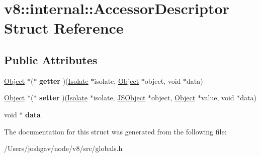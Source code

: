\hypertarget{structv8_1_1internal_1_1_accessor_descriptor}{}\section{v8\+:\+:internal\+:\+:Accessor\+Descriptor Struct Reference}
\label{structv8_1_1internal_1_1_accessor_descriptor}
\subsection*{Public Attributes}
\begin{DoxyCompactItemize}
\item 
\hyperlink{classv8_1_1internal_1_1_object}{Object} $\ast$($\ast$ {\bfseries getter} )(\hyperlink{classv8_1_1internal_1_1_isolate}{Isolate} $\ast$isolate, \hyperlink{classv8_1_1internal_1_1_object}{Object} $\ast$object, void $\ast$data)\hypertarget{structv8_1_1internal_1_1_accessor_descriptor_a0fd4975f95e4accee711fe7144fcd91c}{}\label{structv8_1_1internal_1_1_accessor_descriptor_a0fd4975f95e4accee711fe7144fcd91c}

\item 
\hyperlink{classv8_1_1internal_1_1_object}{Object} $\ast$($\ast$ {\bfseries setter} )(\hyperlink{classv8_1_1internal_1_1_isolate}{Isolate} $\ast$isolate, \hyperlink{classv8_1_1internal_1_1_j_s_object}{J\+S\+Object} $\ast$object, \hyperlink{classv8_1_1internal_1_1_object}{Object} $\ast$value, void $\ast$data)\hypertarget{structv8_1_1internal_1_1_accessor_descriptor_abe99f0b12d8048825a324b575b837dca}{}\label{structv8_1_1internal_1_1_accessor_descriptor_abe99f0b12d8048825a324b575b837dca}

\item 
void $\ast$ {\bfseries data}\hypertarget{structv8_1_1internal_1_1_accessor_descriptor_acc4fa03840c10eea3f97798ea0cfc632}{}\label{structv8_1_1internal_1_1_accessor_descriptor_acc4fa03840c10eea3f97798ea0cfc632}

\end{DoxyCompactItemize}


The documentation for this struct was generated from the following file\+:\begin{DoxyCompactItemize}
\item 
/\+Users/joshgav/node/v8/src/globals.\+h\end{DoxyCompactItemize}
